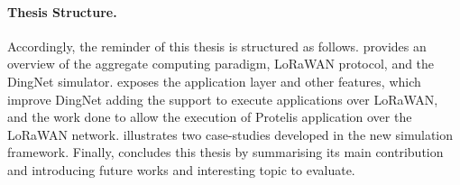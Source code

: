 %
\paragraph{Thesis Structure.} %
Accordingly, the reminder of this thesis is structured as follows.
%
 provides an overview of the aggregate computing paradigm, \mbox{LoRaWAN} protocol, and the DingNet simulator.
% 
 exposes the application layer and other features, which improve DingNet adding the support to execute applications over LoRaWAN, and the work done to allow the execution of Protelis application over the LoRaWAN network.
%  
 illustrates two case-studies developed in the new simulation framework.
% 
Finally,  concludes this thesis by summarising its main contribution and introducing future works and interesting topic to evaluate.